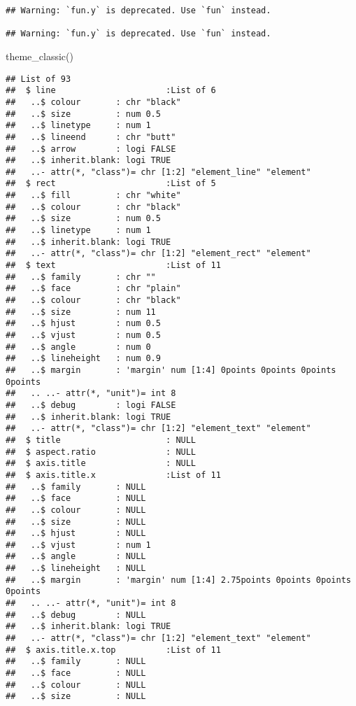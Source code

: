 \documentclass[
]{article}
\newenvironment{Shaded}{\begin{snugshade}}{\end{snugshade}}
\newcommand{\FunctionTok}[1]{\textcolor[rgb]{0.00,0.00,0.00}{#1}}
\newcommand{\NormalTok}[1]{#1}
\begin{document}
\begin{verbatim}
## Warning: `fun.y` is deprecated. Use `fun` instead.

## Warning: `fun.y` is deprecated. Use `fun` instead.
\end{verbatim}

\begin{Shaded}
\begin{Highlighting}[]
  \FunctionTok{theme\_classic}\NormalTok{()  }
\end{Highlighting}
\end{Shaded}

\begin{verbatim}
## List of 93
##  $ line                      :List of 6
##   ..$ colour       : chr "black"
##   ..$ size         : num 0.5
##   ..$ linetype     : num 1
##   ..$ lineend      : chr "butt"
##   ..$ arrow        : logi FALSE
##   ..$ inherit.blank: logi TRUE
##   ..- attr(*, "class")= chr [1:2] "element_line" "element"
##  $ rect                      :List of 5
##   ..$ fill         : chr "white"
##   ..$ colour       : chr "black"
##   ..$ size         : num 0.5
##   ..$ linetype     : num 1
##   ..$ inherit.blank: logi TRUE
##   ..- attr(*, "class")= chr [1:2] "element_rect" "element"
##  $ text                      :List of 11
##   ..$ family       : chr ""
##   ..$ face         : chr "plain"
##   ..$ colour       : chr "black"
##   ..$ size         : num 11
##   ..$ hjust        : num 0.5
##   ..$ vjust        : num 0.5
##   ..$ angle        : num 0
##   ..$ lineheight   : num 0.9
##   ..$ margin       : 'margin' num [1:4] 0points 0points 0points 0points
##   .. ..- attr(*, "unit")= int 8
##   ..$ debug        : logi FALSE
##   ..$ inherit.blank: logi TRUE
##   ..- attr(*, "class")= chr [1:2] "element_text" "element"
##  $ title                     : NULL
##  $ aspect.ratio              : NULL
##  $ axis.title                : NULL
##  $ axis.title.x              :List of 11
##   ..$ family       : NULL
##   ..$ face         : NULL
##   ..$ colour       : NULL
##   ..$ size         : NULL
##   ..$ hjust        : NULL
##   ..$ vjust        : num 1
##   ..$ angle        : NULL
##   ..$ lineheight   : NULL
##   ..$ margin       : 'margin' num [1:4] 2.75points 0points 0points 0points
##   .. ..- attr(*, "unit")= int 8
##   ..$ debug        : NULL
##   ..$ inherit.blank: logi TRUE
##   ..- attr(*, "class")= chr [1:2] "element_text" "element"
##  $ axis.title.x.top          :List of 11
##   ..$ family       : NULL
##   ..$ face         : NULL
##   ..$ colour       : NULL
##   ..$ size         : NULL

\end{verbatim}
\end{document}
